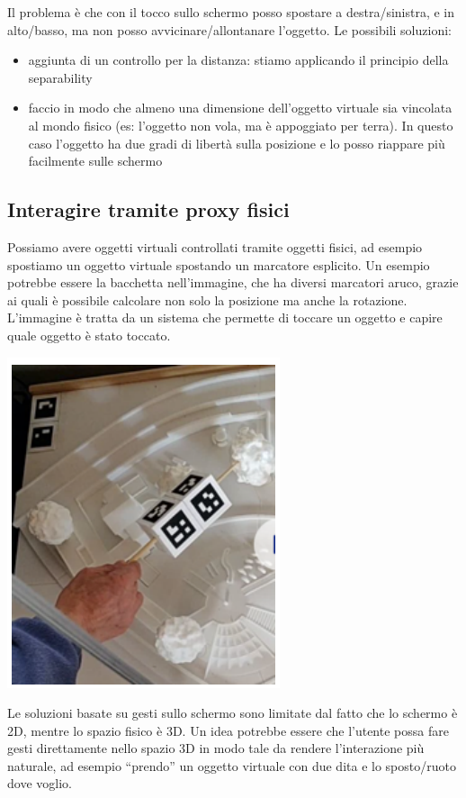 Il problema è che con il tocco sullo schermo posso spostare a destra/sinistra, e in alto/basso, ma non posso avvicinare/allontanare l'oggetto. 
Le possibili soluzioni:
\begin{itemize}
    \item aggiunta di un controllo per la distanza: stiamo applicando il principio della separability
    \item faccio in modo che almeno una dimensione dell'oggetto virtuale sia vincolata al mondo fisico (es: l'oggetto non vola, ma è appoggiato per terra). In questo caso l'oggetto ha due gradi di libertà sulla posizione e lo posso riappare più facilmente sulle schermo
\end{itemize}

\subsection{Interagire tramite proxy fisici}
\begin{minipage}{.4\textwidth}
   Possiamo avere oggetti virtuali controllati tramite oggetti fisici, ad esempio spostiamo un oggetto virtuale spostando un marcatore esplicito.
   Un esempio potrebbe essere la bacchetta nell'immagine, che ha diversi marcatori aruco, grazie ai quali è possibile calcolare non solo la posizione ma anche la rotazione. 
   L'immagine è tratta da un sistema che permette di toccare un oggetto e capire quale oggetto è stato toccato. 
\end{minipage} 
\hfill
\begin{minipage}{.6\textwidth}
    \begin{center}
        \includegraphics[width=.6\textwidth]{images/MobiDEV/4. augmented reality (display e interaction)/interazione tramite schermo.PNG}
    \end{center}
\end{minipage}

Le soluzioni basate su gesti sullo schermo sono limitate dal fatto che lo schermo è 2D, mentre lo spazio fisico è 3D. Un idea potrebbe essere che l'utente possa fare gesti direttamente nello spazio 3D in modo tale da rendere l'interazione più naturale, ad esempio “prendo” un oggetto virtuale con due dita e lo sposto/ruoto dove voglio.

